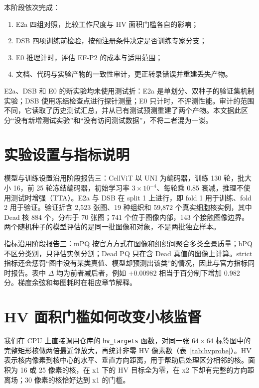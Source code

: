 \documentclass[11pt,a4paper,UTF8,fontset=fandol]{ctexart}
\newcommand{\code}[1]{\nolinkurl{#1}}
\begin{document}
本阶段依次完成：
\begin{enumerate}
\item E2a 四组对照，比较工作尺度与 HV 面积门槛各自的影响；
\item DSB 四项训练前检验，按预注册条件决定是否训练专家分支；
\item E0 推理计时，评估 EF-P2 的成本与适用范围；
\item 文档、代码与实验产物的一致性审计，更正转录错误并重建丢失产物。
\end{enumerate}

E2a、DSB 和 E0 的新实验均未使用测试折：E2a 是单划分、双种子的验证集机制实验；DSB 使用冻结检查点进行探针测量；E0 只计时，不评测性能。审计的范围不同，它读取了历史测试汇总，并从已有测试预测重建了两个产物。本文据此区分“没有新增测试实验”和“没有访问测试数据”，不将二者混为一谈。

\section{实验设置与指标说明}

模型与训练设置沿用阶段报告三：CellViT\cite{cellvit} 以 UNI\cite{uni} 为编码器，训练 130 轮，批大小 16，前 25 轮冻结编码器，初始学习率 $3\times10^{-4}$、每轮乘 0.85 衰减，推理不使用测试时增强（TTA）。E2a 与 DSB 在 split 1 上进行，即 fold 1 用于训练、fold 2 用于验证。验证折含 2,523 张图、19 种组织和 59,872 个真实细胞核实例，其中 Dead 核 884 个，分布于 70 张图；741 个位于图像内部，143 个接触图像边界。两个随机种子的模型评估的是同一批图像和对象，不是两批独立样本。

指标沿用阶段报告三：mPQ 按官方方式在图像和组织间聚合多类全景质量；bPQ 不区分类别，只评估实例分割；Dead PQ 只在含 Dead 真值的图像上计算。strict 指标还会惩罚“图中没有某类真值、模型却预测出该类”的情况，因此与官方指标同时报告。表中 $\Delta$ 均为前者减后者，例如 $+0.00982$ 相当于百分制下增加 0.982 分。梯度余弦和每图耗时在相应章节解释。

\section{HV 面积门槛如何改变小核监督}

我们在 CPU 上直接调用仓库的 \code{hv\_targets} 函数，对同一张 $64\times64$ 标签图中的完整矩形核做两倍最近邻放大，再统计非零 HV 像素数（表~\ref{tab:hvprobe}）。HV 表示核内像素到核中心的水平、垂直方向距离，用于帮助后处理区分相邻的核。面积为 16 或 25 像素的核，在 x1 下的 HV 目标全为零，在 x2 下却有完整的方向距离场；30 像素的核恰好达到 x1 的门槛。
\end{document}

